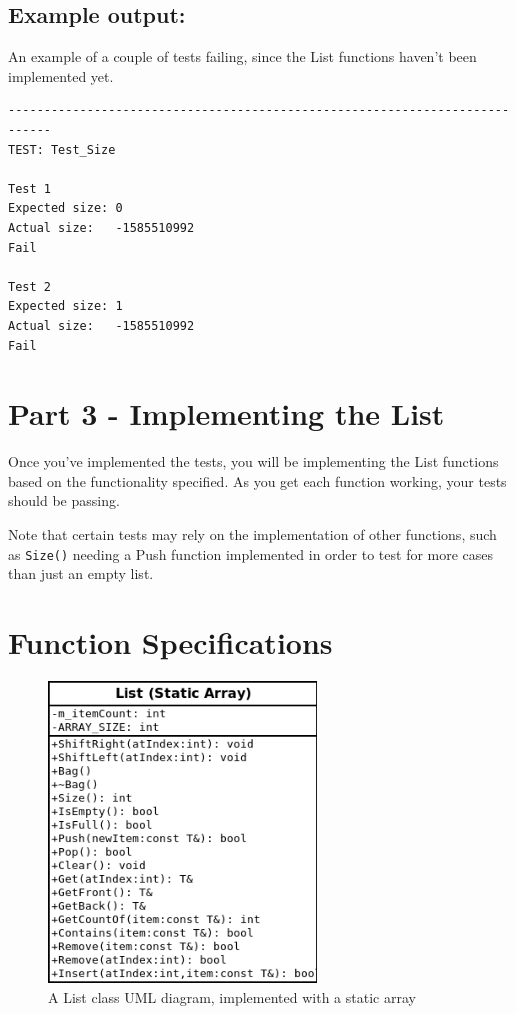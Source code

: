     \subsection{Example output:}

    An example of a couple of tests failing, since the List functions haven't
    been implemented yet.
    
\begin{lstlisting}[style=output]
----------------------------------------------------------------------------
TEST: Test_Size

Test 1
Expected size: 0
Actual size:   -1585510992
Fail

Test 2
Expected size: 1
Actual size:   -1585510992
Fail
\end{lstlisting}

    \hrulefill

    \section{Part 3 - Implementing the List}

    Once you've implemented the tests, you will be implementing the
    List functions based on the functionality specified. As you
    get each function working, your tests should be passing.

    Note that certain tests may rely on the implementation of other
    functions, such as \texttt{Size()} needing a Push function implemented
    in order to test for more cases than just an empty list.

    \newpage

    \section{Function Specifications}

    \begin{figure}[h]
        \centering
        \includegraphics[height=8cm]{images-2018-01/List.png}
        \caption{A List class UML diagram, implemented with a static array}
    \end{figure}


